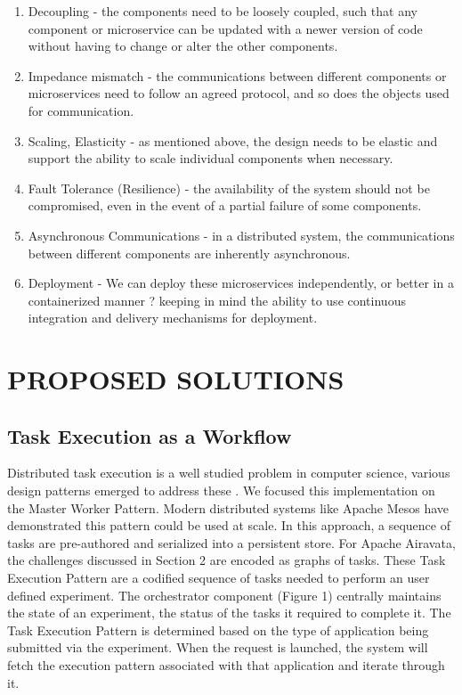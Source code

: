 \documentclass[review]{elsarticle}
\begin{document}
\begin{enumerate}
\item Decoupling - the components need to be loosely coupled, such that any component or microservice can be updated with a newer version of code without having to change or alter the other components.
\item Impedance mismatch - the communications between different components or microservices need to follow an agreed protocol, and so does the objects used for communication. 
\item Scaling, Elasticity - as mentioned above, the design needs to be elastic and support the ability to scale individual components when necessary.
\item Fault Tolerance (Resilience) - the availability of the system should not be compromised, even in the event of a partial failure of some components. 
\item Asynchronous Communications - in a distributed system, the communications between different components are inherently asynchronous.
\item Deployment - We can deploy these microservices independently, or better in a containerized manner ? keeping in mind the ability to use continuous integration and delivery mechanisms for deployment.
\end{enumerate}


\section{PROPOSED SOLUTIONS}

\subsection{Task Execution as a Workflow}
Distributed task execution is a well studied problem in computer science, various design patterns emerged to address these \cite{gamma1995design}. We focused this implementation on the Master Worker Pattern. Modern distributed systems like Apache Mesos\cite{apacheMesos} have demonstrated this pattern could be used at scale. In this approach, a sequence of tasks are pre-authored and serialized into a persistent store. For Apache Airavata, the challenges discussed in Section 2 are encoded as graphs of tasks. These Task Execution Pattern are a codified sequence of tasks needed to perform an user defined experiment.  The orchestrator component (Figure 1) centrally maintains the state of an experiment, the status of the tasks it required to complete it. The Task Execution Pattern is determined based on the type of application being submitted via the experiment.  When the request is launched, the system will fetch the execution pattern associated with that application and iterate through it.
\end{document}
